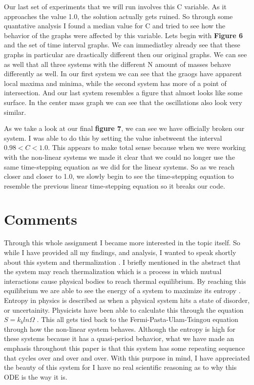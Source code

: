 Our last set of experiments that we will run involves this C variable. As it approaches the value 1.0, the solution actually gets ruined. So through some quantative analysis I found a median value for C and tried to see how the behavior of the graphs were affected by this variable. Lets begin with \textbf{Figure 6} and the set of time interval graphs. We can immediatley already see that these graphs in particular are drastically different then our original graphs. We can see as well that all three systems with the different N amount of masses behave differently as well. In our first system we can see that the graogs have apparent local maxima and minima, while the second system has more of a point of intersection. And our last system resembles a figure that almost looks like some surface. In the center mass graph we can see that the oscillations also look very similar. 

As we take a look at our final \textbf{figure 7}, we can see we have officially broken our system. I was able to do this by setting the value inbetweent the interval $0.98 < C < 1.0$. This appears to make total sense because when we were working with the non-linear systems we made it clear that we could no longer use the same time-stepping equation as we did for the linear systems. So as we reach closer and closer to 1.0, we slowly begin to see the time-stepping equation to resemble the previous linear time-stepping equation so it breaks our code. 

\section{Comments}

Through this whole assignment I became more interested in the topic itself. So while I have provided all my findings, and analysis, I wanted to speak shortly about this system and thermalization \cite{therm}. I briefly mentioned in the abstract that the system may reach thermalization which is a process in which mutual interactions cause physical bodies to reach thermal equilibrium. By reaching this equilibrium we are able to see the energy of a system to maximize its entropy \cite{therm2}. Entropy in physics is described as when a physical system hits a state of disorder, or uncertainity. Physicists have been able to calculate this through the equation $S = k_{b} ln \Omega$ \cite{entropy}. This all gets tied back to the Fermi-Pasta-Ulam-Tsingou equation through how the non-linear system behaves. Although the entropy is high for these systems because it has a quasi-period behavior, what we have made an emphasis throughout this paper is that this system has some repeating sequence that cycles over and over and over. With this purpose in mind, I have appreciated the beauty of this system for I have no real scientific reasoning as to why this ODE is the way it is.

